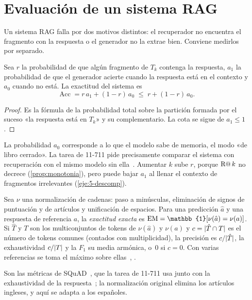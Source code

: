 \section{Evaluación de un sistema RAG}

Un sistema RAG falla por dos motivos distintos: el recuperador no encuentra el fragmento con la respuesta o el generador no la extrae bien. Conviene medirlos por separado.

\begin{proposicion}\label{prop:descomp}
Sea $r$ la probabilidad de que algún fragmento de $T_k$ contenga la respuesta, $a_1$ la probabilidad de que el generador acierte cuando la respuesta está en el contexto y $a_0$ cuando no está. La exactitud del sistema es
\[
\operatorname{Acc}=r\,a_1+(1-r)\,a_0\;\le\;r+(1-r)\,a_0 .
\]
\end{proposicion}

\begin{proof}
Es la fórmula de la probabilidad total sobre la partición formada por el suceso «la respuesta está en $T_k$» y su complementario. La cota se sigue de $a_1\le 1$.
\end{proof}

La probabilidad $a_0$ corresponde a lo que el modelo sabe de memoria, el modo «de libro cerrado». La tarea de 11-711 pide precisamente comparar el sistema con recuperación con el mismo modelo sin ella~\cite{cmu711}. Aumentar $k$ sube $r$, porque $\operatorname{R@}k$ no decrece (\cref{prop:monotonia}), pero puede bajar $a_1$ al llenar el contexto de fragmentos irrelevantes (\cref{eje:5-descomp}).

\begin{definicion}\label{def:em-f1}
Sea $\nu$ una normalización de cadenas: paso a minúsculas, eliminación de signos de puntuación y de artículos y unificación de espacios. Para una predicción $\hat a$ y una respuesta de referencia $a$, la \emph{exactitud exacta} es $\EM=\mathbb{1}[\nu(\hat a)=\nu(a)]$. Si $\hat T$ y $T$ son los multiconjuntos de tokens de $\nu(\hat a)$ y $\nu(a)$ y $c=\lvert\hat T\cap T\rvert$ es el número de tokens comunes (contados con multiplicidad), la precisión es $c/\lvert\hat T\rvert$, la exhaustividad $c/\lvert T\rvert$ y la $F_1$ su media armónica, o~0 si $c=0$. Con varias referencias se toma el máximo sobre ellas~\cite{squad}, \cite[§11.6]{jm3}.
\end{definicion}

Son las métricas de SQuAD~\cite{squad}, que la tarea de 11-711 usa junto con la exhaustividad de la respuesta~\cite{cmu711}; la normalización original elimina los artículos ingleses, y aquí se adapta a los españoles.

